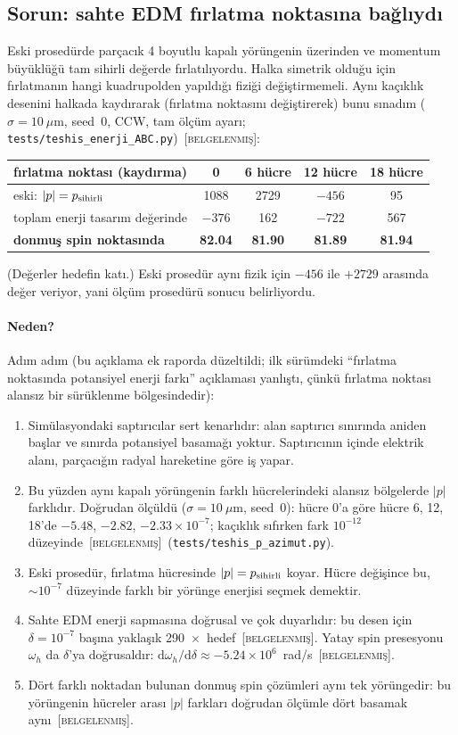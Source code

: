 \documentclass[11pt,a4paper]{article}
\newcommand{\kod}[1]{{\XeTeXinterchartokenstate=0\texttt{#1}}}
\newcommand{\BEL}{\textsc{[belgelenmiş]}}
\begin{document}
\subsection{Sorun: sahte EDM fırlatma noktasına bağlıydı}
Eski prosedürde parçacık 4 boyutlu kapalı yörüngenin üzerinden ve momentum büyüklüğü tam sihirli değerde
fırlatılıyordu. Halka simetrik olduğu için fırlatmanın hangi kuadrupolden yapıldığı fiziği değiştirmemeli.
Aynı kaçıklık desenini halkada kaydırarak (fırlatma noktasını değiştirerek) bunu sınadım ($\sigma=10~\mu$m,
seed~0, CCW, tam ölçüm ayarı; \kod{tests/teshis\_enerji\_ABC.py})~\BEL:
\begin{center}\small
\begin{tabular}{lcccc}
\toprule
fırlatma noktası (kaydırma) & 0 & 6 hücre & 12 hücre & 18 hücre \\
\midrule
eski: $|p|=p_{\rm sihirli}$ & 1088 & 2729 & $-456$ & 95 \\
toplam enerji tasarım değerinde & $-376$ & 162 & $-722$ & 567 \\
\textbf{donmuş spin noktasında} & \textbf{82.04} & \textbf{81.90} & \textbf{81.89} & \textbf{81.94} \\
\bottomrule
\end{tabular}
\end{center}
(Değerler hedefin katı.) Eski prosedür aynı fizik için $-456$ ile $+2729$ arasında değer veriyor, yani
ölçüm prosedürü sonucu belirliyordu.

\paragraph{Neden?} Adım adım (bu açıklama ek raporda düzeltildi; ilk sürümdeki ``fırlatma noktasında
potansiyel enerji farkı'' açıklaması yanlıştı, çünkü fırlatma noktası alansız bir sürüklenme bölgesindedir):
\begin{enumerate}
\item Simülasyondaki saptırıcılar sert kenarlıdır: alan saptırıcı sınırında aniden başlar ve sınırda
potansiyel basamağı yoktur. Saptırıcının içinde elektrik alanı, parçacığın radyal hareketine göre iş yapar.
\item Bu yüzden aynı kapalı yörüngenin farklı hücrelerindeki alansız bölgelerde $|p|$ farklıdır. Doğrudan
ölçüldü ($\sigma=10~\mu$m, seed~0): hücre 0'a göre hücre 6, 12, 18'de $-5.48$, $-2.82$, $-2.33\times10^{-7}$;
kaçıklık sıfırken fark $10^{-12}$ düzeyinde~\BEL\ (\kod{tests/teshis\_p\_azimut.py}).
\item Eski prosedür, fırlatma hücresinde $|p|=p_{\rm sihirli}$ koyar. Hücre değişince bu, $\sim10^{-7}$
düzeyinde farklı bir yörünge enerjisi seçmek demektir.
\item Sahte EDM enerji sapmasına doğrusal ve çok duyarlıdır: bu desen için $\delta=10^{-7}$ başına
yaklaşık 290~$\times$~hedef~\BEL. Yatay spin presesyonu $\omega_h$ da $\delta$'ya doğrusaldır:
$\mathrm{d}\omega_h/\mathrm{d}\delta\approx-5.24\times10^{6}$~rad/s~\BEL.
\item Dört farklı noktadan bulunan donmuş spin çözümleri aynı tek yörüngedir: bu yörüngenin hücreler
arası $|p|$ farkları doğrudan ölçümle dört basamak aynı~\BEL.
\end{enumerate}
\end{document}
